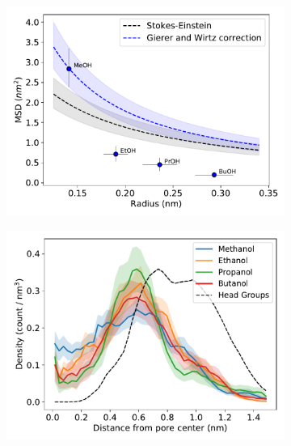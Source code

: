 \documentclass[journal=jpcbfk,manuscript=article]{achemso}
\begin{document}
  \begin{figure}[!htb]
  \centering
  \begin{subfigure}{0.45\textwidth}
  \includegraphics[width=\linewidth]{msd_radius_simple_alcohols_10wt.pdf}
  \caption{}\label{fig:msd_radius_simple_alcohol_rdf}
  \end{subfigure}
  \begin{subfigure}{0.45\textwidth}
  \includegraphics[width=\linewidth]{simple_alcohol_rdf.pdf}
  \caption{}\label{fig:simple_alcohol_rdf}
  \end{subfigure}
  \begin{subfigure}{0.45\textwidth}

\end{subfigure}
\end{figure}
\end{document}
